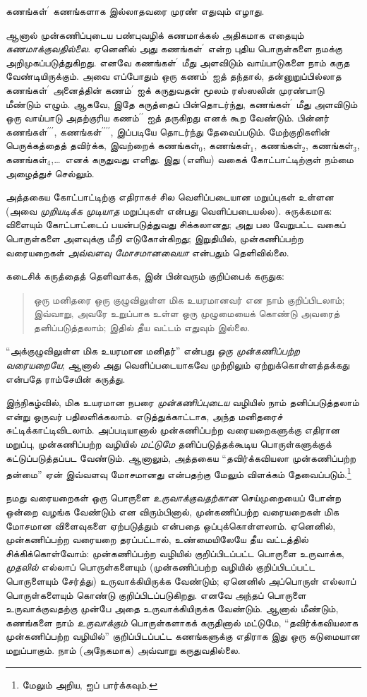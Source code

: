 \documentclass[../../../include/open-logic-section]{subfiles}
\begin{document}
கணங்கள்$^{\prime}$ கணங்களாக இல்லாதவரை முரண் எதுவும் எழாது.

ஆனால் முன்கணிப்புடைய பண்புவழிக் கணமாக்கல் அதிகமாக எதையும்
\emph{கணமாக்குவதில்லை}. ஏனெனில் அது கணங்கள்$^\prime$ என்ற புதிய
பொருள்களை நமக்கு அறிமுகப்படுத்துகிறது. எனவே கணங்கள்$^\prime$ மீது
அளவிடும் வாய்பாடுகளை நாம் கருத வேண்டியிருக்கும். அவை எப்போதும் ஒரு
கணம்$^\prime$ ஐத் தந்தால், தன்னுறுப்பில்லாத கணங்கள்$^\prime$ அனைத்தின்
கணம்$^\prime$ ஐக் கருதுவதன் மூலம் ரஸ்ஸலின் முரண்பாடு மீண்டும் எழும்.
ஆகவே, இதே கருத்தைப் பின்தொடர்ந்து, கணங்கள்$^\prime$ மீது அளவிடும் ஒரு
வாய்பாடு அதற்குரிய கணம்$^{\prime\prime}$ ஐத் தருகிறது எனக் கூற வேண்டும்.
பின்னர் கணங்கள்$^{\prime\prime\prime}$,
கணங்கள்$^{\prime\prime\prime\prime}$, இப்படியே தொடர்ந்து தேவைப்படும்.
மேற்குறிகளின் பெருக்கத்தைத் தவிர்க்க, இவற்றைக் கணங்கள்$_0$,
கணங்கள்$_1$, கணங்கள்$_2$, கணங்கள்$_3$, கணங்கள்$_4$,\ldots\ எனக்
கருதுவது எளிது. இது (எளிய) வகைக் கோட்பாட்டிற்குள் நம்மை அழைத்துச் செல்லும்.

அத்தகைய கோட்பாட்டிற்கு எதிராகச் சில வெளிப்படையான மறுப்புகள் உள்ளன
(அவை \emph{முறியடிக்க முடியாத} மறுப்புகள் என்பது வெளிப்படையல்ல).
சுருக்கமாக: விளையும் கோட்பாட்டைப் பயன்படுத்துவது சிக்கலானது; அது பல
வேறுபட்ட வகைப் பொருள்களை அளவுக்கு மீறி எடுகோள்கிறது; இறுதியில்,
முன்கணிப்பற்ற வரையறைகள் \emph{அவ்வளவு மோசமானவையா} என்பதும் தெளிவில்லை.
	
கடைசிக் கருத்தைத் தெளிவாக்க, \citeauthor{Ramsey1925} இன் பின்வரும்
குறிப்பைக் கருதுக:
\begin{quote}
	ஒரு மனிதரை ஒரு குழுவிலுள்ள மிக உயரமானவர் என நாம் குறிப்பிடலாம்;
	இவ்வாறு, அவரே உறுப்பாக உள்ள ஒரு முழுமையைக் கொண்டு அவரைத்
	தனிப்படுத்தலாம்; இதில் தீய வட்டம் எதுவும் இல்லை.
	\citep{Ramsey1925}
\end{quote}
“அக்குழுவிலுள்ள மிக உயரமான மனிதர்” என்பது
\emph{ஒரு முன்கணிப்பற்ற வரையறையே};
ஆனால் அது வெளிப்படையாகவே முற்றிலும் ஏற்றுக்கொள்ளத்தக்கது என்பதே
ராம்சேயின் கருத்து.

இந்நிகழ்வில், மிக உயரமான நபரை \emph{முன்கணிப்புடைய} வழியில் நாம்
தனிப்படுத்தலாம் என்று ஒருவர் பதிலளிக்கலாம். எடுத்துக்காட்டாக, அந்த
மனிதரைச் சுட்டிக்காட்டிவிடலாம். அப்படியானால் முன்கணிப்பற்ற
வரையறைகளுக்கு எதிரான மறுப்பு, முன்கணிப்பற்ற வழியில் \emph{மட்டுமே}
தனிப்படுத்தக்கூடிய பொருள்களுக்குக் கட்டுப்படுத்தப்பட வேண்டும். ஆனாலும்,
அத்தகைய “தவிர்க்கவியலா முன்கணிப்பற்ற தன்மை” ஏன் இவ்வளவு மோசமானது
என்பதற்கு மேலும் விளக்கம் தேவைப்படும்.\footnote{மேலும் அறிய,
\citet{Linnebo2010} ஐப் பார்க்கவும்.}

நமது வரையறைகள் ஒரு பொருளை \emph{உருவாக்குவதற்கான} செய்முறையைப் போன்ற
ஒன்றை வழங்க வேண்டும் என விரும்பினால், முன்கணிப்பற்ற வரையறைகள் மிக
மோசமான விளைவுகளை ஏற்படுத்தும் என்பதை ஒப்புக்கொள்ளலாம். ஏனெனில்,
முன்கணிப்பற்ற வரையறை தரப்பட்டால், உண்மையிலேயே தீய வட்டத்தில்
சிக்கிக்கொள்வோம்: முன்கணிப்பற்ற வழியில் குறிப்பிடப்பட்ட பொருளை உருவாக்க,
\emph{முதலில்} எல்லாப் பொருள்களையும் (முன்கணிப்பற்ற வழியில்
குறிப்பிடப்பட்ட பொருளையும் சேர்த்து) உருவாக்கியிருக்க வேண்டும்; ஏனெனில்
அப்பொருள் எல்லாப் பொருள்களையும் கொண்டு குறிப்பிடப்படுகிறது. எனவே அந்தப்
பொருளை உருவாக்குவதற்கு முன்பே அதை உருவாக்கியிருக்க வேண்டும். ஆனால்
மீண்டும், கணங்களை நாம் \emph{உருவாக்கும்} பொருள்களாகக் கருதினால் மட்டுமே,
“தவிர்க்கவியலாக முன்கணிப்பற்ற வழியில்” குறிப்பிடப்பட்ட கணங்களுக்கு எதிராக
இது ஒரு கடுமையான மறுப்பாகும். நாம் (அநேகமாக) அவ்வாறு கருதுவதில்லை.
\end{document}
